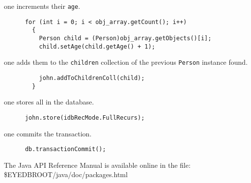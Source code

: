\item one increments their \texttt{age}.
{\verbsize \begin{verbatim}
      for (int i = 0; i < obj_array.getCount(); i++)
        {
          Person child = (Person)obj_array.getObjects()[i];
          child.setAge(child.getAge() + 1);
\end{verbatim}
}
\item one adds them to the \texttt{children} collection of the previous
\texttt{Person} instance found.
{\verbsize \begin{verbatim}
          john.addToChildrenColl(child);
        }
\end{verbatim}
}
\item one stores all in the database.
{\verbsize \begin{verbatim}
      john.store(idbRecMode.FullRecurs);
\end{verbatim}
}
\item one commits the transaction.
{\verbsize \begin{verbatim}
      db.transactionCommit();
\end{verbatim}
}
\ei
{}
The \eyedb Java API Reference Manual is available online in the file:
\\
\$EYEDBROOT/java/doc/packages.html



